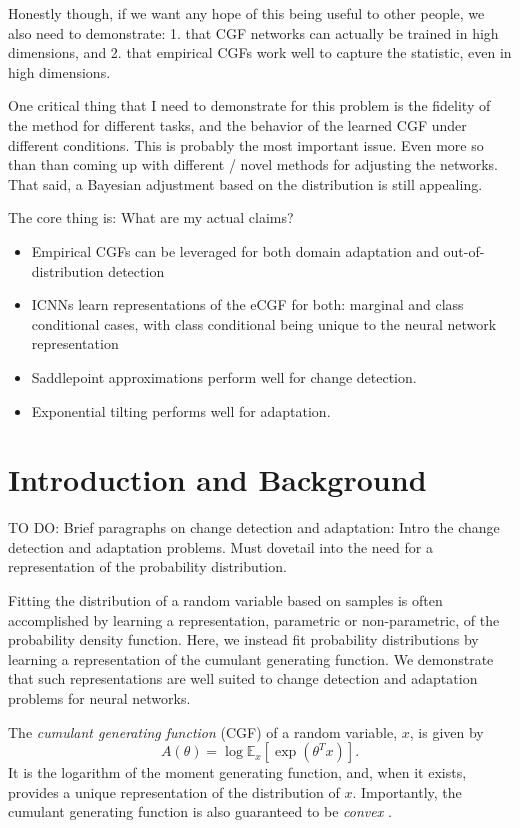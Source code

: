 \documentclass[11pt]{article}      %
\begin{document}
Honestly though, if we want any hope of this being useful to other people, we also need to demonstrate: 1. that CGF networks can actually be trained in high dimensions, and 2. that empirical CGFs work well to capture the statistic, even in high dimensions.

One critical thing that I need to demonstrate for this problem is the fidelity of the method for different tasks, and the behavior of the learned CGF under different conditions. 
This is probably the most important issue. Even more so than than coming up with different / novel methods for adjusting the networks. That said, a Bayesian adjustment based on the distribution is still appealing.


The core thing is: What are my actual claims?
\begin{itemize}
  \item Empirical CGFs can be leveraged for both domain adaptation and out-of-distribution detection
  \item ICNNs learn representations of the eCGF for both: marginal and class conditional cases, with class conditional being unique to the neural network representation
  \item Saddlepoint approximations perform well for change detection.
  \item Exponential tilting performs well for adaptation.
\end{itemize}





\section{Introduction and Background}


TO DO: Brief paragraphs on change detection and adaptation: Intro the change detection and adaptation problems.
Must dovetail into the need for a representation of the probability distribution.


Fitting the distribution of a random variable based on samples is often accomplished by learning a representation, parametric or non-parametric, of the probability density function.
Here, we instead fit probability distributions by learning a representation of the cumulant generating function.
We demonstrate that such representations are well suited to change detection and adaptation problems for neural networks.

The \textit{cumulant generating function} (CGF) of a random variable, $x$, is given by
\begin{equation}
  A(\theta) = \log \mathbb{E}_x[\exp(\theta^T x)]. \label{def:cgf}
\end{equation}
It is the logarithm of the moment generating function, and, when it exists, provides a unique representation of the distribution of $x$.
Importantly, the cumulant generating function is also guaranteed to be \textit{convex} \cite{barndorff2014information}.
\end{document}
